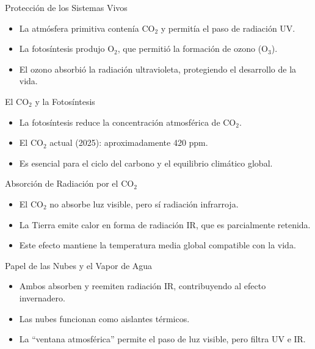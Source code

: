 \documentclass[main.tex]{subfiles}
\begin{document}
\begin{frame}{Protección de los Sistemas Vivos}
  \begin{itemize}
    \item La atmósfera primitiva contenía CO$_2$ y permitía el paso de radiación UV.
    \item La fotosíntesis produjo O$_2$, que permitió la formación de ozono (O$_3$).
    \item El ozono absorbió la radiación ultravioleta, protegiendo el desarrollo de la vida.
  \end{itemize}
\end{frame}


\begin{frame}{El CO$_2$ y la Fotosíntesis}
  \begin{itemize}
    \item La fotosíntesis reduce la concentración atmosférica de CO$_2$.
    \item El CO$_2$ actual (2025): aproximadamente 420 ppm.
    \item Es esencial para el ciclo del carbono y el equilibrio climático global.
  \end{itemize}
\end{frame}

\begin{frame}{Absorción de Radiación por el CO$_2$}
  \begin{itemize}
    \item El CO$_2$ no absorbe luz visible, pero sí radiación infrarroja.
    \item La Tierra emite calor en forma de radiación IR, que es parcialmente retenida.
    \item Este efecto mantiene la temperatura media global compatible con la vida.
  \end{itemize}
\end{frame}

\begin{frame}{Papel de las Nubes y el Vapor de Agua}
  \begin{itemize}
    \item Ambos absorben y reemiten radiación IR, contribuyendo al efecto invernadero.
    \item Las nubes funcionan como aislantes térmicos.
    \item La “ventana atmosférica” permite el paso de luz visible, pero filtra UV e IR.
  \end{itemize}
\end{frame}
\end{document}
